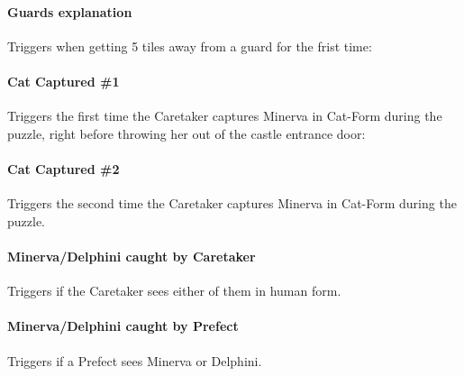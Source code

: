 \paragraph{Guards explanation} Triggers when getting 5 tiles away from a guard for the frist time:

\begin{dialogue}{} 
\end{dialogue}

\paragraph{Cat Captured \#1} Triggers the first time the Caretaker captures Minerva in Cat-Form during the puzzle, right before throwing her out of the castle entrance door:

\begin{dialogue}{} 
\end{dialogue} 

\paragraph{Cat Captured \#2} Triggers the second time the Caretaker captures Minerva in Cat-Form during the puzzle. 

\begin{dialogue}{} 
\end{dialogue} 

\paragraph{Minerva/Delphini caught by Caretaker} Triggers if the Caretaker sees either of them in human form. 

\begin{dialogue}{} 
\end{dialogue} 

\paragraph{Minerva/Delphini caught by Prefect} Triggers if a Prefect sees Minerva or Delphini. 

\begin{dialogue}{} 
\end{dialogue} 

\pagebreak 


